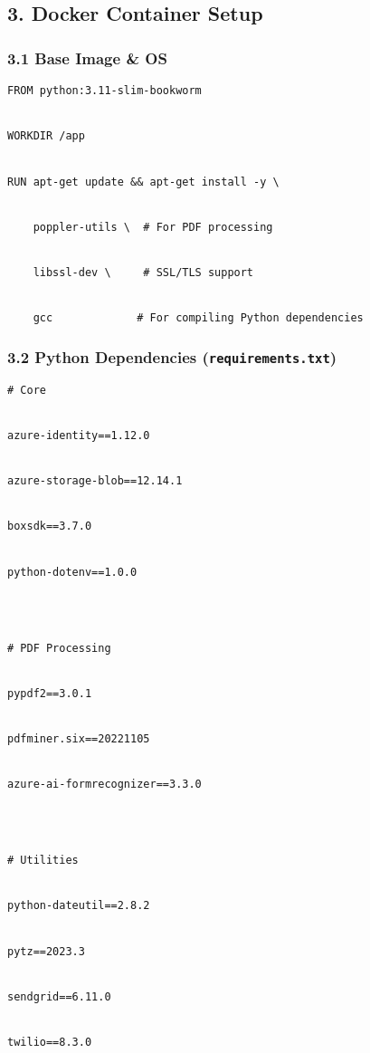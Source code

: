 \documentclass[
]{article}
\begin{document}
\hypertarget{docker-container-setup}{%
\subsection{\texorpdfstring{\textbf{3. Docker Container
Setup}}{3. Docker Container Setup}}\label{docker-container-setup}}

\hypertarget{base-image-os}{%
\subsubsection{\texorpdfstring{\textbf{3.1 Base Image \&
OS}}{3.1 Base Image \& OS}}\label{base-image-os}}

\texttt{FROM\ python:3.11-slim-bookworm}\strut \\
\texttt{WORKDIR\ /app}\strut \\
\texttt{RUN\ apt-get\ update\ \&\&\ apt-get\ install\ -y\ }\texttt{\textbackslash{}}\strut \\
\texttt{\ \ \ \ poppler-utils\ \textbackslash{}\ \ \#\ For\ PDF\ processing}\strut \\
\texttt{\ \ \ \ libssl-dev\ \textbackslash{}\ \ \ \ \ \#\ SSL/TLS\ support}\strut \\
\texttt{\ \ \ \ gcc\ \ \ \ \ \ \ \ \ \ \ \ \ \#\ For\ compiling\ Python\ dependencies}

\hypertarget{python-dependencies-requirements.txt}{%
\subsubsection{\texorpdfstring{\textbf{3.2 Python Dependencies}
(\texttt{requirements.txt})}{3.2 Python Dependencies (requirements.txt)}}\label{python-dependencies-requirements.txt}}

\texttt{\#\ Core}\strut \\
\texttt{azure-identity==1.12.0}\strut \\
\texttt{azure-storage-blob==12.14.1}\strut \\
\texttt{boxsdk==3.7.0}\strut \\
\texttt{py}\texttt{thon-dotenv==1.0.0}\strut \\
\strut \\
\texttt{\#\ PDF\ Processing}\strut \\
\texttt{pypdf2==3.0.1}\strut \\
\texttt{pdfminer.six==20221105}\strut \\
\texttt{azure-ai-formrecognizer==3.3.0}\strut \\
\strut \\
\texttt{\#\ Utilities}\strut \\
\texttt{python-dateutil==2.8.2}\strut \\
\texttt{pytz==2023.3}\strut \\
\texttt{sendgrid==6.11.0}\strut \\
\texttt{twilio==8.3.0}
\end{document}
